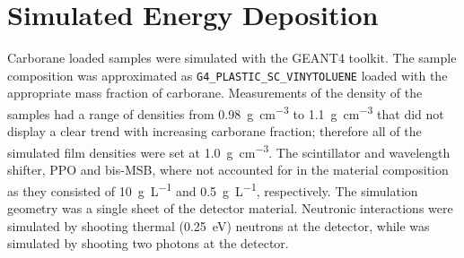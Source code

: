\documentclass[draftcls,onecolumn]{IEEEtran}
\begin{document}
\section{Simulated Energy Deposition}
Carborane loaded samples were simulated with the GEANT4 toolkit.
The sample composition was approximated as \verb+G4_PLASTIC_SC_VINYTOLUENE+ loaded with the appropriate mass fraction of carborane.
Measurements of the density of the samples had a range of densities from \SI{0.98}{\gram\per\cm\cubed} to \SI{1.1}{\gram\per\cm\cubed} that did not display a clear trend with increasing carborane fraction; therefore all of the simulated film densities were set at \SI{1.0}{\gram\per\cm\cubed}.
The scintillator and wavelength shifter, PPO and bis-MSB, where not accounted for in the material composition as they consisted of \SI{10}{\gram\per\liter} and  \SI{0.5}{\gram\per\liter}, respectively.
The simulation geometry was a single sheet of the detector material.
Neutronic interactions were simulated by shooting thermal (\SI{0.25}{\eV}) neutrons at the detector, while  was simulated by shooting two photons at the detector.
\end{document}
